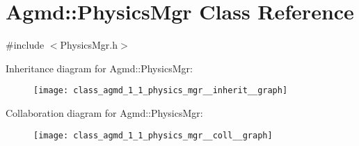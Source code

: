 \hypertarget{class_agmd_1_1_physics_mgr}{\section{Agmd\+:\+:Physics\+Mgr Class Reference}
\label{class_agmd_1_1_physics_mgr}
}


{\ttfamily \#include $<$Physics\+Mgr.\+h$>$}



Inheritance diagram for Agmd\+:\+:Physics\+Mgr\+:\nopagebreak
\begin{figure}[H]
\begin{center}
\leavevmode
\texttt{[image: class\_agmd\_1\_1\_physics\_mgr\_\_inherit\_\_graph]}
\end{center}
\end{figure}


Collaboration diagram for Agmd\+:\+:Physics\+Mgr\+:\nopagebreak
\begin{figure}[H]
\begin{center}
\leavevmode
\texttt{[image: class\_agmd\_1\_1\_physics\_mgr\_\_coll\_\_graph]}
\end{center}
\end{figure}

